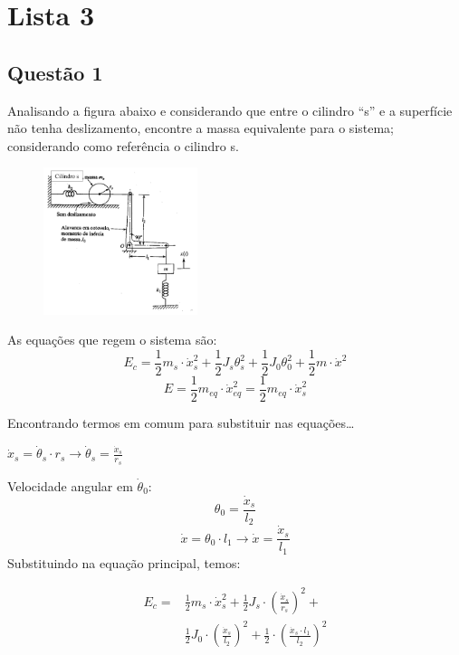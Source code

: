 \section{Lista 3}
\subsection{Questão 1}
Analisando a figura abaixo e considerando que entre o cilindro ``s'' e a
superfície não tenha deslizamento, encontre a massa equivalente para o sistema;
considerando como referência o cilindro s.

\begin{figure}[ht]
    \centering
    \includegraphics[width=0.4\textwidth]{imagens/lista_3_questao_1.png}
    \label{fig:questao1}
\end{figure}

\resol
As equações que regem o sistema são:
\[
    E_c = \frac{1}{2}m_{s}\cdot {\dot{x}_{s}^2} + \frac{1}{2}J_{s}\theta_{s}^2 + \frac{1}{2}J_0\theta_{0}^2 + \frac{1}{2}m\cdot \dot{x}^2
\]
\[
    E = \frac{1}{2}m_{eq}\cdot \dot{x}_{eq}^2 = \frac{1}{2}m_{eq}\cdot \dot{x}_s^2
\]

Encontrando termos em comum para substituir nas equações\ldots

$\dot{x}_s = \dot{\theta}_s \cdot r_s \to \dot{\theta}_s = \frac{\dot{x}_s}{r_s}$

Velocidade angular em $\dot{\theta}_0$:
\[
    \theta_0 = \frac{\dot{x}_s}{l_2}
\]
\[
    \dot x = \theta_0 \cdot l_1 \to \dot x = \frac{\dot{x}_s}{l_1}
\]
Substituindo na equação principal, temos:

    \begin{align*}
        E_c = &\frac{1}{2}m_s\cdot \dot{x}_s^2 + \frac{1}{2}J_s\cdot \left(
    \frac{\dot{x}_s}{r_s} \right)^2 +\\ &\frac{1}{2}J_0\cdot \left( \frac{\dot {x}_s}{l_2} \right)^2 + \frac{1}{2}\cdot \left( \frac{\dot {x}_s\cdot l_1}{l_2} \right)^2
    \end{align*}


